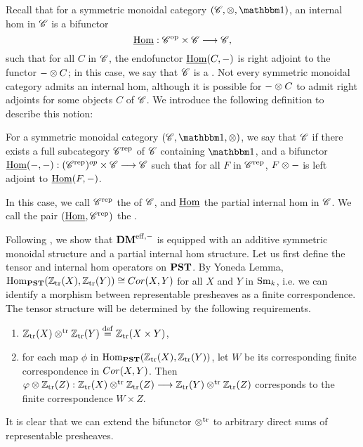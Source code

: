 Recall that for a symmetric monoidal category $(\Cat{C}, \tensor, 
\Unit)$, an internal hom in $\mathscr{C}$ is a bifunctor
\[
\underline{\mathrm{Hom}}: \mathscr{C}^{\mathrm{op}} \times \mathscr{C} \longrightarrow \mathscr{C},
\]
such that for all $C$ in $\mathscr{C}$, the endofunctor $\underline{\mathrm{Hom}}(C, -)$
is right adjoint to the functor $- \otimes C$; in this case, we
say that $\mathscr{C}$ is a .  Not every 
symmetric monoidal category admits an internal hom, although it is
possible for $- \otimes C$ to admit right adjoints for some
objects $C$ of $\mathscr{C}$. We introduce the following definition to
describe this notion:

\begin{defn}\label{def_partial_internal_hom}
For a symmetric monoidal category $(\Cat{C}, \Unit, \tensor)$,
we say that $\mathscr{C}$  if 
there exists a full subcategory $\mathscr{C}^{\mathrm{rep}}$ of $\mathscr{C}$
containing $\Unit$, and a bifunctor $\underline{\mathrm{Hom}}(-,-) : 
(\mathscr{C}^{\mathrm{rep}})^{op} \times \mathscr{C} \longrightarrow \mathscr{C}$ such that for
all $F$ in $\mathscr{C}^{\mathrm{rep}}$, $F \otimes -$ is left adjoint to 
$\underline{\mathrm{Hom}}(F, -)$. 

In this case, we call $\mathscr{C}^{\mathrm{rep}}$ the  of $\mathscr{C}$, and $\underline{\mathrm{Hom}}$ the partial internal hom 
in $\mathscr{C}$. We call the pair $(\underline{\mathrm{Hom}}, \mathscr{C}^{\mathrm{rep}})$ the 
.
\end{defn}

Following \cite{MVW}, we show that $\mathbf{DM}^{\mathrm{eff},-}$ is equipped with an 
additive symmetric monoidal structure and a partial internal hom
structure. Let us first define the tensor and internal hom operators on 
$\mathbf{PST}$. By Yoneda Lemma, $\mathrm{Hom}_{\mathbf{PST}}(\mathbb{Z}_{\mathrm{tr}}(X), \mathbb{Z}_{\mathrm{tr}}(Y)) 
\cong Cor(X, Y)$ for all $X$ and $Y$ in $\mathrm{Sm}_{k}$, i.e. we can 
identify a morphism between representable presheaves as a finite
correspondence. The tensor structure will be determined by the following
requirements. 

\begin{enumerate}
\item $\mathbb{Z}_{\mathrm{tr}}(X) \otimes^{\mathrm{tr}} \mathbb{Z}_{\mathrm{tr}}(Y) \stackrel{\mathrm{def}}{=} \mathbb{Z}_{\mathrm{tr}}(X \times Y)$, 

\item for each map $\phi$ in $\mathrm{Hom}_{\mathbf{PST}}(\mathbb{Z}_{\mathrm{tr}}(X), \mathbb{Z}_{\mathrm{tr}}(Y))$, let
$W$ be its corresponding finite correspondence in $Cor(X, Y)$. Then 
$\varphi \otimes \mathbb{Z}_{\mathrm{tr}}(Z): \mathbb{Z}_{\mathrm{tr}}(X) \otimes^{\mathrm{tr}} \mathbb{Z}_{\mathrm{tr}}(Z) \longrightarrow \mathbb{Z}_{\mathrm{tr}}(Y) \otimes^{\mathrm{tr}} \mathbb{Z}_{\mathrm{tr}}(Z)$
corresponds to the finite correspondence $W \times Z$. 
\end{enumerate}
\noindent It is clear that we can extend the bifunctor $\otimes^{\mathrm{tr}}$ to 
arbitrary direct sums of representable presheaves.  

